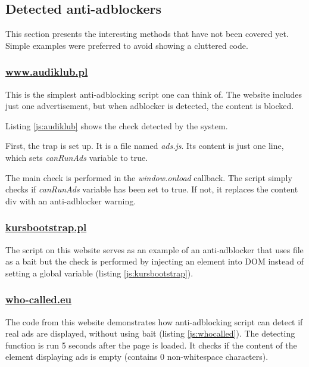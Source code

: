 \subsection{Detected anti-adblockers}

This section presents the interesting methods that have not been covered yet.
Simple examples were preferred to avoid showing a cluttered code.

\subsubsection{\url{www.audiklub.pl}}
\label{audiklub}
This is the simplest anti-adblocking script one can think of. The website includes just one advertisement, 
but when adblocker
is detected, the content is blocked.

Listing \ref{js:audiklub} shows the check detected by the system.



First, the trap is set up. It is a file named \emph{ads.js}.
Its content is just one line, which sets \emph{canRunAds} variable to true.

The main check is performed in the \emph{window.onload} callback. The script simply checks
if \emph{canRunAds} variable has been set to true. If not, it replaces the content div with an anti-adblocker warning.

\subsubsection{\url{kursbootstrap.pl}}
The script on this website serves as an example of an anti-adblocker that uses file as a bait
but the check is performed by injecting an element into DOM instead of setting a global variable
(listing \ref{js:kursbootstrap}).


                       
\subsubsection{\url{who-called.eu}}
The code from this website demonstrates how anti-adblocking script can detect if real
ads are displayed, without using bait (listing \ref{js:whocalled}).
The detecting function is run 5 seconds after the page is loaded. It checks if the content 
of the element displaying ads is empty (contains 0 non-whitespace characters).

